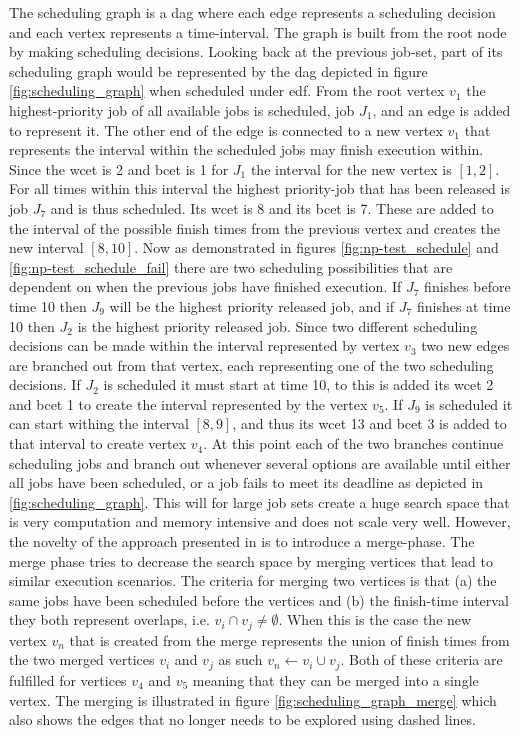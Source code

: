 \documentclass{kththesis}
\begin{document}
The scheduling graph is a \acrshort{dag} where each edge represents a scheduling decision and each
vertex represents a time-interval. The graph is built from the root node by making scheduling
decisions. Looking back at the previous job-set, part of its scheduling graph would be represented
by the \acrshort{dag} depicted in figure \ref{fig:scheduling_graph} when scheduled under
\acrshort{edf}. From the root vertex $v_1$ the highest-priority job of all available jobs is
scheduled, job $J_1$, and an edge is added to represent it. The other end of the edge is connected
to a new vertex $v_1$ that represents the interval within the scheduled jobs may finish execution
within. Since the \acrshort{wcet} is 2 and \acrshort{bcet} is 1 for $J_1$ the interval for the new
vertex is $[1, 2]$.  For all times within this interval the highest priority-job that has been
released is job $J_7$ and is thus scheduled.  Its \acrshort{wcet} is 8 and its \acrshort{bcet} is 7.
These are added to the interval of the possible finish times from the previous vertex and creates
the new interval $[8,10]$. Now as demonstrated in figures \ref{fig:np-test_schedule} and
\ref{fig:np-test_schedule_fail} there are two scheduling possibilities that are dependent on when
the previous jobs have finished execution. If $J_7$ finishes before time 10 then $J_9$ will be the
highest priority released job, and if $J_7$ finishes at time 10 then $J_2$ is the highest priority
released job. Since two different scheduling decisions can be made within the interval represented
by vertex $v_3$ two new edges are branched out from that vertex, each representing one of the two
scheduling decisions. If $J_2$ is scheduled it must start at time 10, to this is added its
\acrshort{wcet} 2 and \acrshort{bcet} 1 to create the interval represented by the vertex $v_5$. If
$J_9$ is scheduled it can start withing the interval $[8, 9]$, and thus its \acrshort{wcet} 13 and
\acrshort{bcet} 3 is added to that interval to create vertex $v_4$. At this point each of the two
branches continue scheduling jobs and branch out whenever several options are available until either
all jobs have been scheduled, or a job fails to meet its deadline as depicted in
\ref{fig:scheduling_graph}. This will for large job sets create a huge search space that is very
computation and memory intensive and does not scale very well. However, the novelty of the approach
presented in \parencite{nasri_exact_2017} is to introduce a merge-phase. The merge phase tries to
decrease the search space by merging vertices that lead to similar execution scenarios. The
criteria for merging two vertices is that (a) the same jobs have been scheduled before the vertices
and (b) the finish-time interval they both represent overlaps, i.e. $v_i \cap v_j \neq \emptyset$.
When this is the case the new vertex $v_n$ that is created from the merge represents the union of
finish times from the two merged vertices $v_i$ and $v_j$ as such $v_n \gets v_i \cup v_j$. Both of
these criteria are fulfilled for vertices $v_4$ and $v_5$ meaning that they can be merged into a
single vertex. The merging is illustrated in figure \ref{fig:scheduling_graph_merge} which also
shows the edges that no longer needs to be explored using dashed lines.
\end{document}
